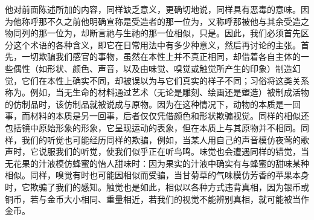 他对前面陈述所加的内容，同样缺乏意义，更确切地说，同样具有恶毒的意味。因为他称呼那不久之前他明确宣称是受造者的那一位为，又称呼那被他与其余受造之物同列的那一位为，却断言祂与生祂的那一位相似，只是。因此，我们必须首先区分这个术语的各种含义，即它在日常用法中有多少种意义，然后再讨论的主张。\newline{}\newline{}首先，一切欺骗我们感官的事物，虽然在本性上并不真正相同，却借着各自主体的一些偶性（如形状、颜色、声音，以及由味觉、嗅觉或触觉所产生的印象）制造幻觉，它们在本性上确实不同，却被误以为与它们真实的样子不同；习俗将这类关系称为。例如，当无生命的材料通过艺术（无论是雕刻、绘画还是塑造）被制成活物的仿制品时，该仿制品就被说成与原物。因为在这种情况下，动物的本质是一回事，而材料的本质是另一回事，后者仅仅凭借颜色和形状欺骗视觉。同样的相似还包括镜中原始形象的形象，它呈现运动的表象，但在本质上与其原物并不相同。同样，我们的听觉也可能经历同样的欺骗，例如，当某人用自己的声音模仿夜莺的歌声时，它说服我们的听觉，使我们似乎正在听鸟鸣。味觉也会遭遇同样的错觉，当无花果的汁液模仿蜂蜜的怡人甜味时：因为果实的汁液中确实有与蜂蜜的甜味某种相似。同样，嗅觉有时也可能因相似而受骗，当甘菊草的气味模仿芳香的苹果本身时，它欺骗了我们的感知。触觉也是如此，相似以各种方式违背真相，因为银币或铜币，若与金币大小相同、重量相近，若我们的视觉不能辨别真相，就可能被当作金币。\par

